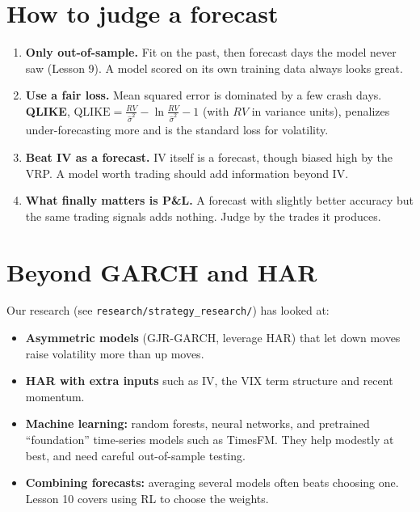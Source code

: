 \documentclass{article}
\begin{document}
\section{How to judge a forecast}

\begin{enumerate}

\item \textbf{Only out-of-sample.} Fit on the past, then forecast days the model never saw (Lesson 9). A model scored on its own training data always looks great.

\item \textbf{Use a fair loss.} Mean squared error is dominated by a few crash days. \textbf{QLIKE}, $\text{QLIKE} = \frac{RV}{\hat{\sigma}^2} - \ln\frac{RV}{\hat{\sigma}^2} - 1$ (with $RV$ in variance units), penalizes under-forecasting more and is the standard loss for volatility.

\item \textbf{Beat IV as a forecast.} IV itself is a forecast, though biased high by the VRP. A model worth trading should add information beyond IV.

\item \textbf{What finally matters is P\&L.} A forecast with slightly better accuracy but the same trading signals adds nothing. Judge by the trades it produces.

\end{enumerate}

\section{Beyond GARCH and HAR}

Our research (see \texttt{research/\allowbreak{}strategy\_\allowbreak{}research/\allowbreak{}}) has looked at:

\begin{itemize}

\item \textbf{Asymmetric models} (GJR-GARCH, leverage HAR) that let down moves raise volatility more than up moves.

\item \textbf{HAR with extra inputs} such as IV, the VIX term structure and recent momentum.

\item \textbf{Machine learning:} random forests, neural networks, and pretrained ``foundation'' time-series models such as TimesFM. They help modestly at best, and need careful out-of-sample testing.

\item \textbf{Combining forecasts:} averaging several models often beats choosing one. Lesson 10 covers using RL to choose the weights.

\end{itemize}
\end{document}
